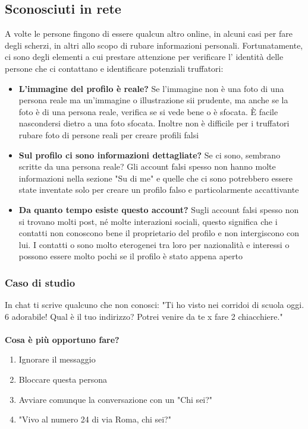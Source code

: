 \documentclass{article}
\begin{document}
\subsection{Sconosciuti in rete}
A volte le persone fingono di essere qualcun altro online, in alcuni casi per fare degli scherzi, in altri allo scopo di rubare informazioni personali. Fortunatamente, ci sono degli elementi a cui prestare attenzione per verificare l' identità delle persone che ci contattano e identificare potenziali truffatori:
\begin{itemize}
	\item \textbf{L'immagine del profilo è reale?} Se l'immagine non è una foto di una persona reale ma un'immagine o illustrazione sii prudente, ma anche se la foto è di una persona reale, verifica se si vede bene o è sfocata. È facile nascondersi dietro a una foto sfocata. Inoltre non è difficile per i truffatori rubare foto di persone reali per creare profili falsi
	\item \textbf{Sul profilo ci sono informazioni dettagliate?} Se ci sono, sembrano scritte da una persona reale? Gli account falsi spesso non hanno molte informazioni nella sezione "Su di me" e quelle che ci sono potrebbero essere state inventate solo per creare un profilo falso e particolarmente accattivante
	\item \textbf{Da quanto tempo esiste questo account?} Sugli account falsi spesso non si trovano molti post, né molte interazioni sociali, questo significa che i contatti non conoscono bene il proprietario del profilo e non intergiscono con lui. I contatti o sono molto eterogenei tra loro per nazionalità e interessi o possono essere molto pochi se il profilo è stato appena aperto
\end{itemize}
\subsubsection{Caso di studio}
\label{sec:Caso11}
In chat ti scrive qualcuno che non conosci: "Ti ho visto nei corridoi di scuola oggi. 6 adorabile! Qual è il tuo indirizzo? Potrei venire da te x fare 2 chiacchiere."
\\\vspace{5mm}\\
\textbf{Cosa è più opportuno fare?}
\begin{enumerate}
	\item Ignorare il messaggio
	\item Bloccare questa persona
	\item Avviare comunque la conversazione con un "Chi sei?"
	\item "Vivo al numero 24 di via Roma, chi sei?"
\end{enumerate}
\end{document}
